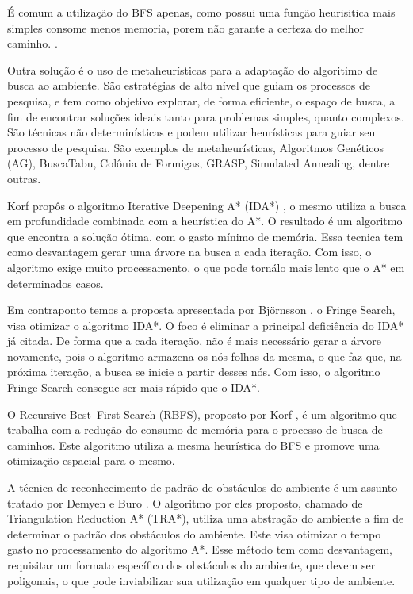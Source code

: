 É comum a utilização do BFS apenas, como possui uma função heurisitica mais simples consome menos memoria, porem não garante a certeza do melhor caminho. \cite{UlyssesTCC}\cite{Russell}.

Outra solução é o uso de metaheurísticas para a adaptação do algoritimo de busca ao ambiente. São estratégias de alto nível que guiam os processos de pesquisa, e tem como objetivo explorar, de forma eficiente, o espaço de busca, a fim de encontrar soluções ideais tanto para problemas simples, quanto  complexos. São técnicas não determinísticas e
podem utilizar heurísticas para guiar seu processo de pesquisa. São exemplos de metaheurísticas, Algoritmos Genéticos (AG), BuscaTabu, Colônia de Formigas, GRASP, Simulated Annealing, dentre outras. \cite{Blum}

Korf propôs o algoritmo Iterative Deepening A* (IDA*) \cite{Korf85}, o mesmo utiliza a busca em  profundidade combinada com a heurística do A*. O resultado é um algoritmo que encontra a solução ótima, com o gasto mínimo de memória. Essa tecnica tem como desvantagem gerar uma árvore na busca a cada iteração. Com isso, o algoritmo exige muito processamento, o que pode tornálo mais lento que o A* em determinados casos.

Em contraponto temos a proposta apresentada por Björnsson \cite{Bjornsson}, o Fringe Search, visa otimizar o algoritmo IDA*. O foco é eliminar a principal deficiência do IDA* já citada. De forma que a cada iteração, não é mais necessário gerar a árvore  novamente, pois o algoritmo armazena os nós folhas da mesma, o que faz que, na próxima iteração, a busca se inicie a partir desses nós. Com isso, o algoritmo Fringe Search consegue ser mais rápido
que o IDA*.

O Recursive Best–First Search (RBFS), proposto por Korf \cite{Korf92}, é um algoritmo que trabalha com a redução do consumo de memória para o processo de busca de caminhos. Este algoritmo utiliza a mesma heurística do BFS e promove uma otimização espacial para o mesmo.

A técnica de reconhecimento de padrão de obstáculos do ambiente é um assunto tratado por Demyen e Buro \cite{Demyen}. O algoritmo por eles proposto, chamado de Triangulation Reduction A* (TRA*), utiliza uma abstração do ambiente a fim de determinar o padrão dos obstáculos do ambiente. Este visa otimizar o tempo gasto no processamento do algoritmo A*. Esse método tem como desvantagem, requisitar um formato específico dos obstáculos do ambiente, que devem ser poligonais, o que pode inviabilizar sua utilização em
qualquer tipo de ambiente.

